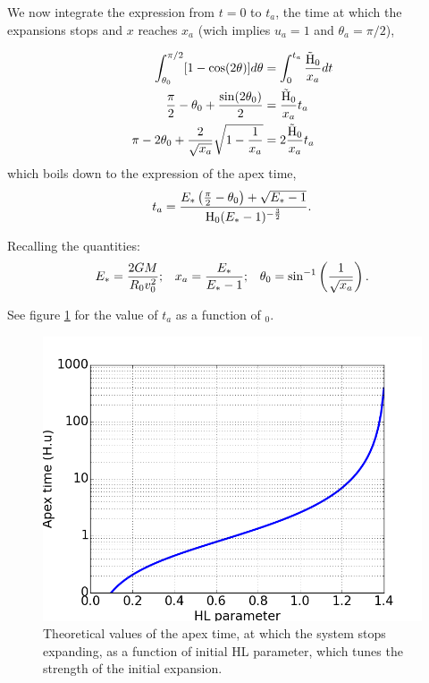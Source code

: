 We now integrate the expression from $t=0$ to $t_a$, the time at which the expansions stops and $x$ reaches $x_a$ (wich implies $u_a = 1$ and $\theta_a = \pi /2$), 

\begin{align}
\int^{\pi/2}_{\theta_0} [ 1 - \cos(2\theta)]d\theta  & = \int^{t_a}_0 \frac{\tilde{{\textrm{H}}}_0}{x_a} dt\\
\frac{\pi}{2} - \theta_0 + \frac{\sin(2\theta_0)}{2} & =  \frac{\tilde{{\textrm{H}}}_0}{x_a} t_a\\
\pi - 2 \theta_0 + \frac{2}{\sqrt{x_a}}\sqrt{1-\frac{1}{x_a}} & = 2 \frac{\tilde{{\textrm{H}}}_0}{x_a} t_a 
\end{align}
which boils down to the expression of the apex time,
\begin{equation}
t_a = \frac{E_\ast \left(\frac{\pi}{2} - \theta_0\right) + \sqrt{E_\ast-1}}{{\textrm{H}}_0 (E_\ast-1)^{-\frac{3}{2}}}.
\end{equation}

Recalling the quantities:
\begin{align}
E_\ast = \frac{2GM}{R_0 v_0^2}        &;  & x_a=\frac{E_\ast}{E_\ast-1}  &;  &\theta_0 = \sin^{-1}\left(\frac{1}{\sqrt{x_a}}\right).  
\end{align}

See figure \ref{Fig:apextime} for the value of $t_a$ as a function of \Hub$_0$.

\begin{figure}
\center
\includegraphics[width=0.7\linewidth]{Figures/1_apextime.png}
\caption[Theoretical values of the apex time vs HL parameter]{Theoretical values of the apex time, at which the system stops expanding, as a function of initial HL parameter, which tunes the strength of the initial expansion.}
\label{Fig:apextime}
\end{figure} 





